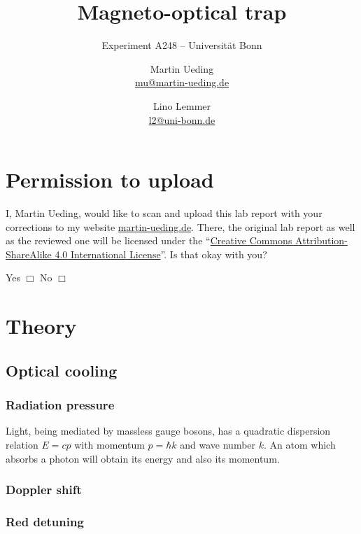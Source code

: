 \documentclass[11pt, english, fleqn, DIV=15, headinclude, BCOR=2cm]{scrreprt}
\title{Magneto-optical trap}
\subtitle{Experiment A248 -- Universität Bonn}
\author{%
    Martin Ueding \\
    \small{\href{mailto:mu@martin-ueding.de}{mu@martin-ueding.de}}
    \and
    Lino Lemmer \\
    \small{\href{mailto:l2@uni-bonn.de}{l2@uni-bonn.de}}
}
\date{\daterange{2016-04-25}{2016-04-26}}
\begin{document}
\maketitle

\begin{abstract}
\end{abstract}

\tableofcontents

\chapter*{Permission to upload}

I, Martin Ueding, would like to scan and upload this lab report with your
corrections to my website \href{http://martin-ueding.de}{martin-ueding.de}.
There, the original lab report as well as the reviewed one will be licensed
under the “\href{http://creativecommons.org/licenses/by-sa/4.0/}{Creative
Commons Attribution-ShareAlike 4.0 International License}”. Is that okay with
you?

Yes $\Box$ \hspace{2cm} No $\Box$

\chapter{Theory}

\section{Optical cooling}

\subsection{Radiation pressure}

Light, being mediated by massless gauge bosons, has a quadratic dispersion
relation $E = cp$ with momentum $p = \hbar k$ and wave number $k$. An atom
which absorbs a photon will obtain its energy and also its momentum.


\subsection{Doppler shift}

\subsection{Red detuning}
\end{document}
